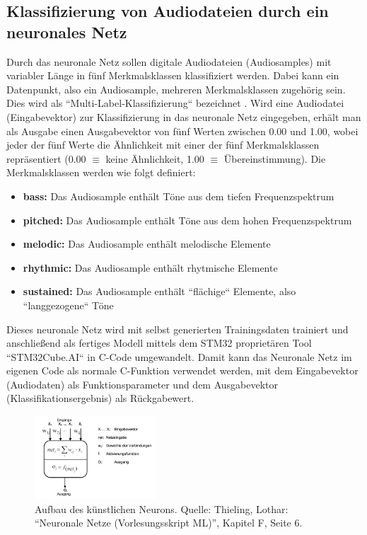 \subsection{Klassifizierung von Audiodateien durch ein neuronales Netz}
Durch das neuronale Netz sollen digitale Audiodateien (Audiosamples) mit variabler Länge in fünf Merkmalsklassen klassifiziert werden. Dabei kann ein Datenpunkt, also ein Audiosample, mehreren Merkmalsklassen zugehörig sein. Dies wird als ``Multi-Label-Klassifizierung`` bezeichnet \cite{multilabel-classification}. Wird eine Audiodatei (Eingabevektor) zur Klassifizierung in das neuronale Netz eingegeben, erhält man als Ausgabe einen Ausgabevektor von fünf Werten zwischen 0.00 und 1.00, wobei jeder der fünf Werte  die Ähnlichkeit mit einer der fünf Merkmalsklassen repräsentiert (0.00 $\equiv$ keine Ähnlichkeit, 1.00 $\equiv$ Übereinstimmung). Die Merkmalsklassen werden wie folgt definiert:
    \begin{itemize}
        \item \textbf{bass:} Das Audiosample enthält Töne aus dem tiefen Frequenzspektrum
       	\item \textbf{pitched:} Das Audiosample enthält Töne aus dem hohen Frequenzspektrum
        \item \textbf{melodic:} Das Audiosample enthält melodische Elemente
        \item \textbf{rhythmic:} Das Audiosample enthält rhytmische Elemente
        \item \textbf{sustained:} Das Audiosample enthält ``flächige`` Elemente, also ``langgezogene`` Töne
    \end{itemize}

Dieses neuronale Netz wird mit selbst generierten Trainingsdaten trainiert und anschließend als fertiges Modell mittels dem STM32 proprietären Tool ``STM32Cube.AI`` in C-Code umgewandelt. Damit kann das Neuronale Netz im eigenen Code als normale C-Funktion verwendet werden, mit dem Eingabevektor (Audiodaten) als Funktionsparameter und dem Ausgabevektor (Klassifikationsergebnis) als Rückgabewert. \cite{stm32-cube-ai-documentation}

\begin{figure}
    \centering
    \includegraphics[width=0.4\textwidth]{images/08_durchfuehrung/nn/neuron-aufbau.png}
    \caption{Aufbau des künstlichen Neurons. Quelle: Thieling, Lothar: “Neuronale Netze (Vorlesungsskript ML)”, Kapitel F, Seite 6.}
    \label{fig:img-aufbau-neuron}
\end{figure}

